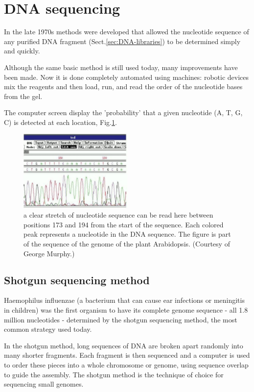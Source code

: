 \section{DNA sequencing}
\label{sec:DNA-sequencing}

In the late 1970s methods were developed that allowed the nucleotide sequence of
any purified DNA fragment (Sect.\ref{sec:DNA-libraries}) to be determined simply
and quickly.

Although the same basic method is still used today, many improvements have been
made. Now it is done completely automated using machines: robotic devices mix
the reagents and then load, run, and read the order of the nucleotide bases from
the gel.

The computer screen display the 'probability' that a given nucleotide (A, T, G,
C) is detected at each location, Fig.\ref{fig:DNA-sequencing}.

\begin{figure}[htb]
  \centerline{\includegraphics[height=4cm]{./images/DNA-sequencing.eps}}
  \caption{a clear stretch of nucleotide sequence can be read here between positions 173
and 194 from the start of the sequence. Each colored peak represents a
nucleotide in the DNA sequence. The figure is part of the
sequence of the genome of the plant Arabidopsis. (Courtesy of George Murphy.)}
\label{fig:DNA-sequencing}
\end{figure}

\subsection{Shotgun sequencing method}
\label{sec:shotgun-sequencing-method}

Haemophilus influenzae (a bacterium that can cause ear infections or meningitis
in children) was the first organism to have its complete genome sequence - all
1.8 million nucleotides - determined by the shotgun sequencing method, the most
common strategy used today.

In the shotgun method, long sequences of DNA are broken apart randomly into many
shorter fragments. Each fragment is then sequenced and a computer is used to
order these pieces into a whole chromosome or genome, using sequence overlap to
guide the assembly. The shotgun method is the technique of choice for sequencing
small genomes. 

